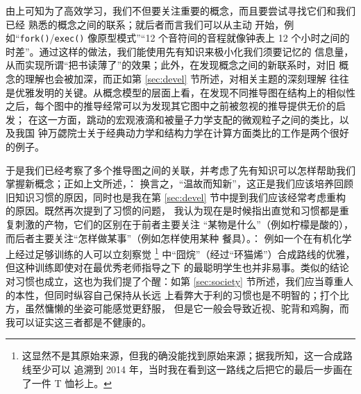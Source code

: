 由上可知为了高效学习，我们不但要关注重要的概念，而且要尝试寻找它们和我们已经
熟悉的概念之间的联系；就后者而言我们可以从主动%
开始，例如“\verb|fork()|/\verb|exec()| 像原型模式”“12 个音符间的音程就像钟表上
12 个小时之间的时差”。通过这样的做法，我们能使用先有知识来极小化我们须要记忆的
信息量，从而实现所谓“把书读薄了”的效果；此外，在发现概念之间的新联系时，对旧
概念的理解也会被加深，而正如第 \ref{sec:devel} 节所述，对相关主题的深刻理解
往往是优雅发明的关键。从概念模型的层面上看，在发现不同推导图在结构上的相似性
之后，每个图中的推导经常可以为发现其它图中之前被忽视的推导提供无价的启发；
在这一方面，跳动的宏观液滴和被量子力学支配的微观粒子之间的类比，以及我国
钟万勰院士关于经典动力学和结构力学在计算方面类比的工作是两个很好的例子。

于是我们已经考察了多个推导图之间的关联，并考虑了先有知识可以怎样帮助我们
掌握新概念；正如上文所述，：
换言之，“温故而知新”，这正是我们应该培养回顾旧知识习惯的原因，同时也是我在第
\ref{sec:devel} 节中提到我们应该经常考虑重构的原因。既然再次提到了习惯的问题，
我认为现在是时候指出直觉和习惯都是重复刺激的产物，它们的区别在于前者主要关注
“某物是什么”（例如柠檬是酸的），而后者主要关注“怎样做某事”（例如怎样使用某种
餐具）。：
例如一个在有机化学上经过足够训练的人可以立刻察觉 \parencite{zxhxy2018}\footnote%
{这显然不是其原始来源，但我的确没能找到原始来源；据我所知，这一合成路线至少可以
追溯到 2014 年，当时我在看到这一路线之后把它的最后一步画在了一件 T 恤衫上。}%
中“囧烷”（经过“环猫烯”）合成路线的优雅，但这种训练即使对在最优秀老师指导之下
的最聪明学生也并非易事。类似的结论对习惯也成立，这也为我们提了个醒：如第
\ref{sec:society} 节所述，我们应当尊重人的本性，但同时纵容自己保持从长远
上看弊大于利的习惯也是不明智的；打个比方，虽然慵懒的坐姿可能感觉更舒服，
但是它一般会导致近视、驼背和鸡胸，而我可以证实这三者都是不健康的。

